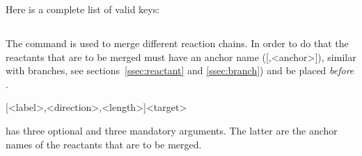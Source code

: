 \documentclass[toc=index,DIV10]{cnpkgdoc}
\begin{document}
Here is a complete list of valid keys:
\begin{beschreibung}
\end{beschreibung}

\subsection{}\label{ssec:merge}
The  command is used to merge different reaction chains. In order to
do that the reactants that are to be merged must have an anchor name
([,<anchor>]{}), similar with branches, see sections~\ref{ssec:reactant}
and \ref{ssec:branch}) and be placed \emph{before} .
\begin{beschreibung}
 [<label>,<direction>,<length>]{<target>}
\end{beschreibung}
 has three optional and three mandatory arguments. The latter are the
anchor names of the reactants that are to be merged.
\begin{beispiel}
 \begin{rxn}
 \end{rxn}
\end{beispiel}
\end{document}
